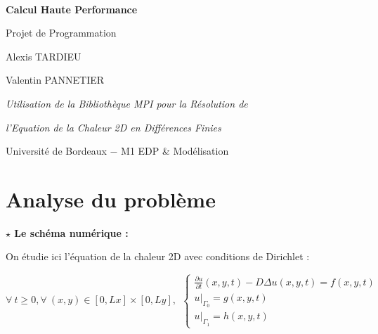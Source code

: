 \documentclass[11pt]{article}
\def \disp {\displaystyle}
\begin{document}
{~}

\thispagestyle{empty}

\vspace{50 mm}

\centerline{\Huge \textbf{Calcul Haute Performance}}

\vspace{15 mm}

\centerline{\LARGE \sc Projet de Programmation}

\vspace{15 mm}

\centerline{\Large Alexis TARDIEU}

\centerline{\vspace{1 mm}}

\centerline{\Large Valentin PANNETIER}

\vspace{15 mm}

\centerline{\Large \textit{Utilisation de la Bibliothèque MPI pour la Résolution de}}

\centerline{\vspace{1 mm}}

\centerline{\Large \textit{l'Equation de la Chaleur 2D en Différences Finies}}

\vspace{30 mm}

\centerline{\Large Université de Bordeaux $-$ M1 EDP \& Modélisation}

\newpage

\section{Analyse du problème}

\noindent
\textbf{$\star$ Le schéma numérique :}

\vspace{5 mm}

\noindent
On étudie ici l'équation de la chaleur 2D avec conditions de Dirichlet :

$$\forall~t \geq 0, \forall~(x,y) \in [0,Lx]\times[0,Ly],~~ \left\{
    \begin{array}{lll}
        \disp \frac{\partial u}{\partial t}(x,y,t) - D \Delta u(x,y,t) = f(x,y,t) \\
        u|_{\Gamma_0} = g(x,y,t) \\
        u|_{\Gamma_1} = h(x,y,t)
    \end{array}
\right.$$

\vspace{5 mm}
\end{document}
